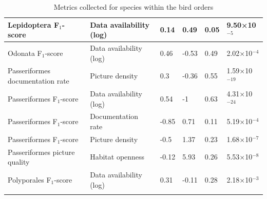 \documentclass{article}
\begin{document}
\begin{longtable}{|p{} | p{} | p{} | p{} | p{} | p{} |}
  Lepidoptera F$_1$-score            & Data availability (log) & 0.14  & 0.49  & 0.05 & 9.50×10$^{-5}$  \\ \hline
  Odonata F$_1$-score                & Data availability (log) & 0.46  & -0.53 & 0.49 & 2.02×10$^{-4}$  \\ \hline
  Passeriformes documentation rate   & Picture density         & 0.3   & -0.36 & 0.55 & 1.59×10$^{-19}$ \\ \hline
  Passeriformes F$_1$-score          & Data availability (log) & 0.54  & -1    & 0.63 & 4.31×10$^{-24}$ \\ \hline
  Passeriformes F$_1$-score          & Documentation rate      & -0.85 & 0.71  & 0.11 & 5.19×10$^{-4}$  \\ \hline
  Passeriformes F$_1$-score          & Picture density         & -0.5  & 1.37  & 0.23 & 1.68×10$^{-7}$  \\ \hline
  Passeriformes picture quality      & Habitat openness        & -0.12 & 5.93  & 0.26 & 5.53×10$^{-8}$  \\ \hline
  Polyporales F$_1$-score            & Data availability (log) & 0.31  & -0.11 & 0.28 & 2.18×10$^{-3}$  \\ \hline

  \hline


  \caption{\footnotesize Metrics collected for species within the bird orders}
  \label{tab:stats}
\end{longtable}
\end{document}
